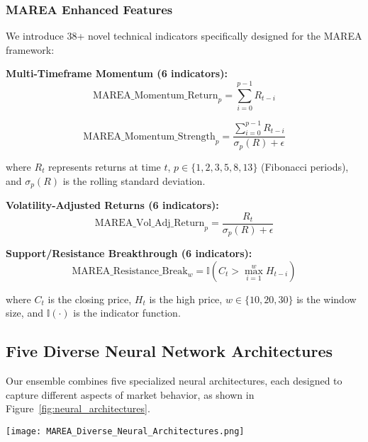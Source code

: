 \documentclass[10pt,twocolumn]{article}
\begin{document}
\subsubsection{MAREA Enhanced Features}

We introduce 38+ novel technical indicators specifically designed for the MAREA framework:

\noindent \textbf{Multi-Timeframe Momentum (6 indicators):}
\begin{equation}
\text{MAREA\_Momentum\_Return}_p = \sum_{i=0}^{p-1} R_{t-i}
\end{equation}

\begin{equation}
\text{MAREA\_Momentum\_Strength}_p = \frac{\sum_{i=0}^{p-1} R_{t-i}}{\sigma_p(R) + \epsilon}
\end{equation}

where $R_t$ represents returns at time $t$, $p \in \{1,2,3,5,8,13\}$ (Fibonacci periods), and $\sigma_p(R)$ is the rolling standard deviation.

\noindent \textbf{Volatility-Adjusted Returns (6 indicators):}
\begin{equation}
\text{MAREA\_Vol\_Adj\_Return}_p = \frac{R_t}{\sigma_p(R) + \epsilon}
\end{equation}

\noindent \textbf{Support/Resistance Breakthrough (6 indicators):}
\begin{equation}
\text{MAREA\_Resistance\_Break}_w = \mathbb{I}(C_t > \max_{i=1}^{w} H_{t-i})
\end{equation}

where $C_t$ is the closing price, $H_t$ is the high price, $w \in \{10,20,30\}$ is the window size, and $\mathbb{I}(\cdot)$ is the indicator function.

\subsection{Five Diverse Neural Network Architectures}

Our ensemble combines five specialized neural architectures, each designed to capture different aspects of market behavior, as shown in Figure~\ref{fig:neural_architectures}.

\begin{figure*}[!htb]
\centering
\vspace{0.2cm}
\texttt{[image: MAREA\_Diverse\_Neural\_Architectures.png]}
\vspace{0.1cm}
\caption{Five Diverse Neural Network Architectures. The ensemble combines: (1) MAREA-Ultra-1: GRU with 16-head multi-head attention for ultra-aggressive patterns, (2) MAREA-Momentum: LSTM with temporal convolution for momentum modeling, (3) MAREA-Return: Transformer encoder optimized for return prediction, (4) MAREA-Trend: CNN with bidirectional LSTM for trend analysis, and (5) MAREA-HF: 1D CNN with GRU for high-frequency pattern recognition. Each model has distinct specifications and learning characteristics.}
\label{fig:neural_architectures}
\vspace{0.2cm}
\end{figure*}
\end{document}
